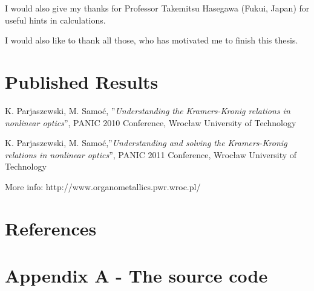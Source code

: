 \documentclass[12pt,twoside,a4paper]{article}
\numberwithin{equation}{subsection}
\numberwithin{figure}{subsection}
\begin{document}
I would also give my thanks for Professor Takemitsu Hasegawa (Fukui, Japan) for useful hints in calculations.

I would also like to thank all those, who has motivated me to finish this thesis.

\section{Published Results} \label{chap:published_results}


K. Parjaszewski, M. Samoć, ''\textit{Understanding the Kramers-Kronig relations in nonlinear optics}'', PANIC 2010 Conference, Wrocław University of Technology


K. Parjaszewski, M. Samoć,''\textit{Understanding and solving the Kramers-Kronig relations in nonlinear optics}'', PANIC 2011 Conference, Wrocław University of Technology


More info: http://www.organometallics.pwr.wroc.pl/


\section{References}
\nocite{*}




\section*{Appendix A - The source code}
\end{document}

